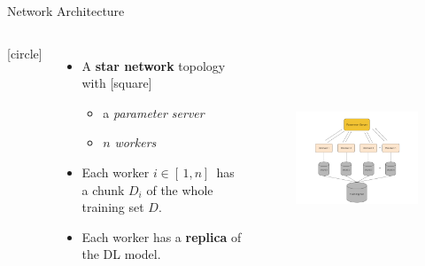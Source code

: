 \begin{frame}{Network Architecture}
    \begin{columns}
        [circle]
        \begin{itemize}
            \item{A \textbf{star network} topology with
            [square]
            \begin{itemize}
                \item a \emph{parameter server}
                \item $n$ \emph{workers}
            \end{itemize}}
            \vspace{0.2cm}
            \item{Each worker $i \in [\,1,n]\,$ has a chunk $D_i$ of the whole training set $D$.}
            \vspace{0.2cm}
            \item{Each worker has a \textbf{replica} of the DL model.}
        \end{itemize}
        \begin{figure}
            \includegraphics[width=8.5cm,height=6cm,center]{images/parameter-server.png}\label{fig:param-server}
        \end{figure}
    \end{columns}
\end{frame}

